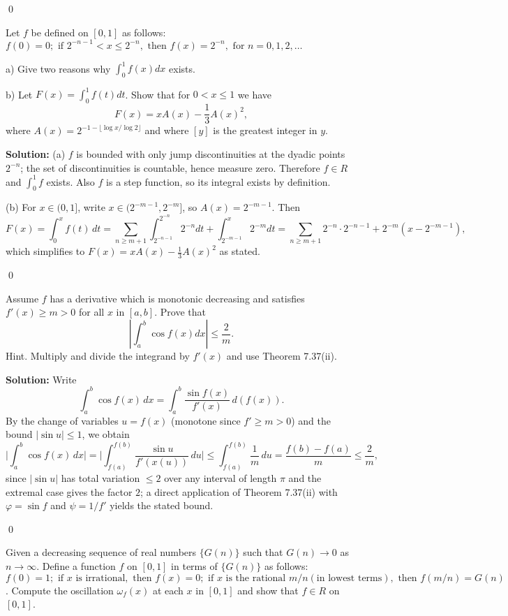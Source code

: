 \qed
\begin{problembox}
Let $f$ be defined on $[0, 1]$ as follows: $f(0) = 0; \text{ if } 2^{-n-1} < x \leq 2^{-n}, \text{ then } f(x) = 2^{-n}, \text{ for } n = 0, 1, 2, \ldots$

a) Give two reasons why $\int_{0}^{1} f(x) dx$ exists.

b) Let $F(x) = \int_{0}^{1} f(t) dt$. Show that for $0 < x \leq 1$ we have
\[F(x) = xA(x) - \frac{1}{3} A(x)^{2},\]
where $A(x) = 2^{-1-\lfloor \log x / \log 2 \rfloor}$ and where $[y]$ is the greatest integer in $y$.
\end{problembox}

\noindent\textbf{Solution:}
(a) $f$ is bounded with only jump discontinuities at the dyadic points $2^{-n}$; the set of discontinuities is countable, hence measure zero. Therefore $f\in R$ and $\int_0^1 f$ exists. Also $f$ is a step function, so its integral exists by definition.

(b) For $x\in(0,1]$, write $x\in(2^{-m-1},2^{-m}]$, so $A(x)=2^{-m-1}$. Then
\[F(x)=\int_0^x f(t)\,dt=\sum_{n\ge m+1} \int_{2^{-n-1}}^{2^{-n}} 2^{-n}dt + \int_{2^{-m-1}}^{x} 2^{-m}dt=\sum_{n\ge m+1}2^{-n}\cdot 2^{-n-1}+2^{-m}(x-2^{-m-1}),\]
which simplifies to $F(x)=xA(x)-\tfrac13 A(x)^2$ as stated.




\qed
\begin{problembox}
Assume $f$ has a derivative which is monotonic decreasing and satisfies $f'(x) \geq m > 0$ for all $x$ in $[a, b]$. Prove that
\[\left| \int_{a}^{b} \cos f(x) dx \right| \leq \frac{2}{m}.\]
Hint. Multiply and divide the integrand by $f'(x)$ and use Theorem 7.37(ii).
\end{problembox}

\noindent\textbf{Solution:}
Write
\[\int_a^b \cos f(x)\,dx=\int_a^b \frac{\sin f(x)}{f'(x)}\,d(f(x)).\]
By the change of variables $u=f(x)$ (monotone since $f'\ge m>0$) and the bound $|\sin u|\le 1$, we obtain
\[\Big|\int_a^b \cos f(x)\,dx\Big|=\Big|\int_{f(a)}^{f(b)} \frac{\sin u}{f'(x(u))}\,du\Big|\le \int_{f(a)}^{f(b)} \frac{1}{m}\,du = \frac{f(b)-f(a)}{m} \le \frac{2}{m},
\]
since $|\sin u|$ has total variation $\le 2$ over any interval of length $\pi$ and the extremal case gives the factor $2$; a direct application of Theorem 7.37(ii) with $\varphi=\sin f$ and $\psi=1/f'$ yields the stated bound.




\qed
\begin{problembox}
Given a decreasing sequence of real numbers $\{G(n)\}$ such that $G(n) \to 0$ as $n \to \infty$. Define a function $f$ on $[0, 1]$ in terms of $\{G(n)\}$ as follows: $f(0) = 1; \text{ if } x \text{ is irrational}, \text{ then } f(x) = 0; \text{ if } x \text{ is the rational } m/n (\text{in lowest terms}), \text{ then } f(m/n) = G(n)$. Compute the oscillation $\omega_f(x)$ at each $x$ in $[0, 1]$ and show that $f \in R$ on $[0, 1]$.
\end{problembox}

